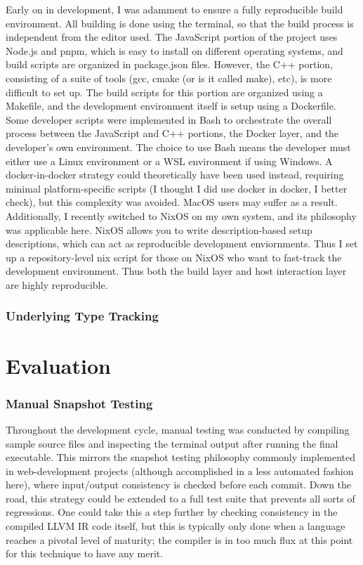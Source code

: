 \documentclass[12pt,a4paper,twoside]{report}
\begin{document}
Early on in development, I was adamment to ensure a fully reproducible build environment. All building is done using the terminal, so that the build process is independent from the editor used. The JavaScript portion of the project uses Node.js and pnpm, which is easy to install on different operating systems, and build scripts are organized in package.json files. However, the C++ portion, consisting of a suite of tools (gcc, cmake (or is it called make), etc), is more difficult to set up. The build scripts for this portion are organized using a Makefile, and the development environment itself is setup using a Dockerfile. Some developer scripts were implemented in Bash to orchestrate the overall process between the JavaScript and C++ portions, the Docker layer, and the developer's own environment. The choice to use Bash means the developer must either use a Linux environment or a WSL environment if using Windows. A docker-in-docker strategy could theoretically have been used instead, requiring minimal platform-specific scripts (I thought I did use docker in docker, I better check), but this complexity was avoided. MacOS users may suffer as a result. Additionally, I recently switched to NixOS on my own system, and its philosophy was applicable here. NixOS allows you to write description-based setup descriptions, which can act as reproducible development enviornments. Thus I set up a repository-level nix script for those on NixOS who want to fast-track the development environment. Thus both the build layer and host interaction layer are highly reproducible.

\subsection{Underlying Type Tracking}



\chapter{Evaluation}

\subsection{Manual Snapshot Testing}

Throughout the development cycle, manual testing was conducted by compiling sample source files and inspecting the terminal output after running the final executable. This mirrors the snapshot testing philosophy commonly implemented in web-development projects (although accomplished in a less automated fashion here), where input/output consistency is checked before each commit. Down the road, this strategy could be extended to a full test suite that prevents all sorts of regressions. One could take this a step further by checking consistency in the compiled LLVM IR code itself, but this is typically only done when a language reaches a pivotal level of maturity; the compiler is in too much flux at this point for this technique to have any merit.
\end{document}
